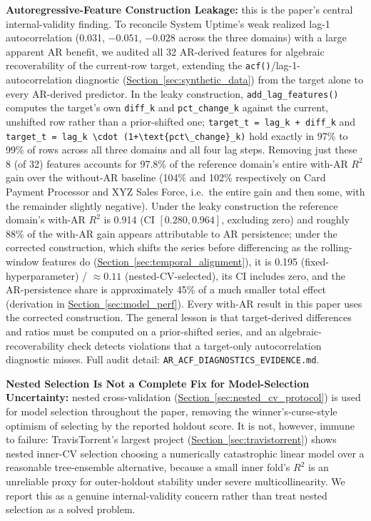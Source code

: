 \documentclass[technologies,article,submit,pdftex,moreauthors]{Definitions/mdpi}
\begin{document}
\textbf{Autoregressive-Feature Construction Leakage:} this is the paper's central internal-validity finding. To reconcile System Uptime's weak realized lag-1 autocorrelation (0.031, \(-0.051\), \(-0.028\) across the three domains) with a large apparent AR benefit, we audited all 32 AR-derived features for algebraic recoverability of the current-row target, extending the \texttt{acf()}/lag-1-autocorrelation diagnostic (\hyperref[sec:synthetic_data]{Section~\ref*{sec:synthetic_data}}) from the target alone to every AR-derived predictor. In the leaky construction, \texttt{add\_lag\_features()} computes the target's own \texttt{diff\_k} and \texttt{pct\_change\_k} against the current, unshifted row rather than a prior-shifted one; \texttt{target\_t\ =\ lag\_k\ +\ diff\_k} and \texttt{target\_t\ =\ lag\_k\ \textbackslash{}cdot\ (1+\textbackslash{}text\{pct\textbackslash{}\_change\}\_k)} hold exactly in 97\% to 99\% of rows across all three domains and all four lag steps. Removing just these 8 (of 32) features accounts for 97.8\% of the reference domain's entire with-AR \(R^2\) gain over the without-AR baseline (104\% and 102\% respectively on Card Payment Processor and XYZ Sales Force, i.e.~the entire gain and then some, with the remainder slightly negative). Under the leaky construction the reference domain's with-AR \(R^2\) is 0.914 (CI \([0.280, 0.964]\), excluding zero) and roughly 88\% of the with-AR gain appears attributable to AR persistence; under the corrected construction, which shifts the series before differencing as the rolling-window features do (\hyperref[sec:temporal_alignment]{Section~\ref*{sec:temporal_alignment}}), it is 0.195 (fixed-hyperparameter) / \(\approx 0.11\) (nested-CV-selected), its CI includes zero, and the AR-persistence share is approximately 45\% of a much smaller total effect (derivation in \hyperref[sec:model_perf]{Section~\ref*{sec:model_perf}}). Every with-AR result in this paper uses the corrected construction. The general lesson is that target-derived differences and ratios must be computed on a prior-shifted series, and an algebraic-recoverability check detects violations that a target-only autocorrelation diagnostic misses. Full audit detail: \texttt{AR\_ACF\_DIAGNOSTICS\_EVIDENCE.md}.

\textbf{Nested Selection Is Not a Complete Fix for Model-Selection Uncertainty:} nested cross-validation (\hyperref[sec:nested_cv_protocol]{Section~\ref*{sec:nested_cv_protocol}}) is used for model selection throughout the paper, removing the winner's-curse-style optimism of selecting by the reported holdout score. It is not, however, immune to failure: TravisTorrent's largest project (\hyperref[sec:travistorrent]{Section~\ref*{sec:travistorrent}}) shows nested inner-CV selection choosing a numerically catastrophic linear model over a reasonable tree-ensemble alternative, because a small inner fold's \(R^2\) is an unreliable proxy for outer-holdout stability under severe multicollinearity. We report this as a genuine internal-validity concern rather than treat nested selection as a solved problem.
\end{document}
